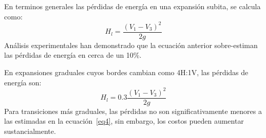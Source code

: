 \documentclass[11pt, oneside]{article}
\begin{document}
En terminos generales las p\'erdidas de energ\'ia en una expansi\'on subita, se calcula como:
\begin{equation}
    H_l = \frac{\left( V_1 - V_3 \right)^2}{2g}
    \label{eq3}
\end{equation}
An\'alisis experimentales han demonstrado que la ecuaci\'on anterior sobre-estiman las p\'erdidas de energ\'ia en cerca de un 10\%.

En expansiones graduales cuyos bordes cambian como 4H:1V, las p\'erdidas de energ\'ia son:
\begin{equation}
    H_l = 0.3\frac{\left( V_1 - V_3 \right)^2}{2g}
    \label{eq4}
\end{equation}
Para transiciones m\'as graduales, las p\'erdidas no son significativamente menores a las estimadas en la ecuaci\'on~\ref{eq4}, sin embargo, los costos pueden aumentar sustancialmente.
\end{document}
